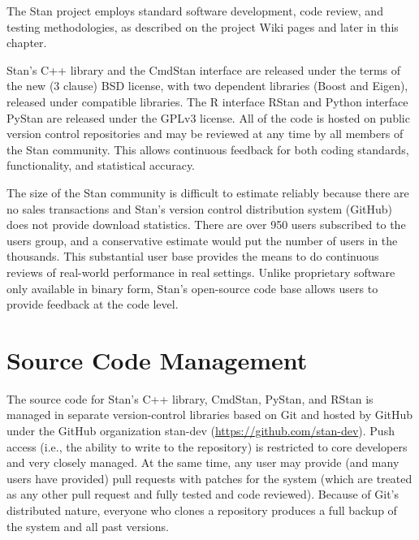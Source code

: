 The Stan project employs standard software development, code review,
and testing methodologies, as described on the project Wiki pages
and later in this chapter.

Stan's C++ library and the CmdStan interface are released under the
terms of the new (3 clause) BSD license, with two dependent libraries
(Boost and Eigen), released under compatible libraries. The R
interface RStan and Python interface PyStan are released under the
GPLv3 license. All of the code is hosted on public version control
repositories and may be reviewed at any time by all members of the
Stan community.  This allows continuous feedback for both coding
standards, functionality, and statistical accuracy.

The size of the Stan community is difficult to estimate reliably
because there are no sales transactions and Stan's version control
distribution system (GitHub) does not provide download statistics.
There are over 950 users subscribed to the users group, and a
conservative estimate would put the number of users in the thousands.
This substantial user base provides the means to do continuous reviews
of real-world performance in real settings. Unlike proprietary
software only available in binary form, Stan's open-source code base
allows users to provide feedback at the code level.

\section{Source Code Management}

The source code for Stan's C++ library, CmdStan, PyStan, and RStan is
managed in separate version-control libraries based on Git
\citep{Chacon:2014} and hosted by GitHub under the GitHub organization
stan-dev (\url{https://github.com/stan-dev}). Push access (i.e., the
ability to write to the repository) is restricted to core developers
and very closely managed. At the same time, any user may provide (and
many users have provided) pull requests with patches for the system
(which are treated as any other pull request and fully tested and code
reviewed). Because of Git's distributed nature, everyone who clones a
repository produces a full backup of the system and all past versions.

